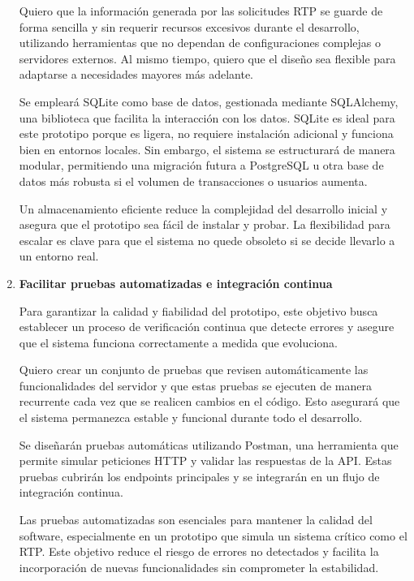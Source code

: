 \begin{enumerate}[label=\textbf{\arabic*}]
    Quiero que la información generada por las solicitudes RTP se guarde de forma sencilla y sin requerir recursos excesivos durante el desarrollo, utilizando herramientas que no dependan de configuraciones complejas o servidores externos. Al mismo tiempo, quiero que el diseño sea flexible para adaptarse a necesidades mayores más adelante.

    Se empleará SQLite como base de datos, gestionada mediante SQLAlchemy, una biblioteca que facilita la interacción con los datos. SQLite es ideal para este prototipo porque es ligera, no requiere instalación adicional y funciona bien en entornos locales. Sin embargo, el sistema se estructurará de manera modular, permitiendo una migración futura a PostgreSQL u otra base de datos más robusta si el volumen de transacciones o usuarios aumenta.

    Un almacenamiento eficiente reduce la complejidad del desarrollo inicial y asegura que el prototipo sea fácil de instalar y probar. La flexibilidad para escalar es clave para que el sistema no quede obsoleto si se decide llevarlo a un entorno real.
  
  \item \textbf{Facilitar pruebas automatizadas e integración continua}

    Para garantizar la calidad y fiabilidad del prototipo, este objetivo busca establecer un proceso de verificación continua que detecte errores y asegure que el sistema funciona correctamente a medida que evoluciona.

    Quiero crear un conjunto de pruebas que revisen automáticamente las funcionalidades del servidor y que estas pruebas se ejecuten de manera recurrente cada vez que se realicen cambios en el código. Esto asegurará que el sistema permanezca estable y funcional durante todo el desarrollo.

    Se diseñarán pruebas automáticas utilizando Postman, una herramienta que permite simular peticiones HTTP y validar las respuestas de la API. Estas pruebas cubrirán los endpoints principales y se integrarán en un flujo de integración continua.

    Las pruebas automatizadas son esenciales para mantener la calidad del software, especialmente en un prototipo que simula un sistema crítico como el RTP. Este objetivo reduce el riesgo de errores no detectados y facilita la incorporación de nuevas funcionalidades sin comprometer la estabilidad.

\end{enumerate}

